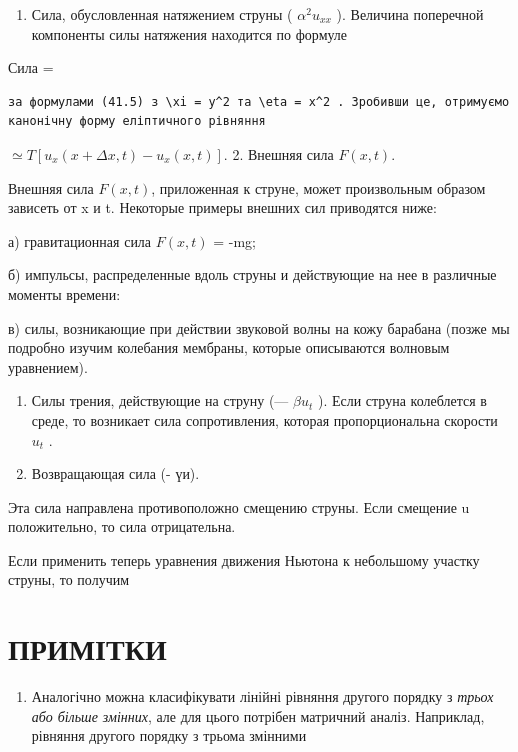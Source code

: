 \documentclass[
  ukrainian,
]{article}
\providecommand{\tightlist}{%
  \setlength{\itemsep}{0pt}\setlength{\parskip}{0pt}}
\begin{document}
\begin{enumerate}
\def\labelenumi{\arabic{enumi}.}
\tightlist
\item
  Сила, обусловленная натяжением струны ( \(\alpha^2 u_{xx}\) ).
  Величина поперечной компоненты силы натяжения находится по формуле
\end{enumerate}

Сила =

\begin{verbatim}
за формулами (41.5) з \xi = y^2 та \eta = x^2 . Зробивши це, отримуємо канонічну форму еліптичного рівняння
\end{verbatim}

\(\simeq T [u_x(x + \Delta x, t) - u_x(x, t)].\) 2. Внешняя сила
\(F (x, t)\).

Внешняя сила \(F(x, t)\), приложенная к струне, может произвольным
образом зависеть от x и t. Некоторые примеры внешних сил приводятся
ниже:

а) гравитационная сила \(F(x, t)\) = -mg;

б) импульсы, распределенные вдоль струны и действующие на нее в
различные моменты времени:

в) силы, возникающие при действии звуковой волны на кожу барабана (позже
мы подробно изучим колебания мембраны, которые описываются волновым
уравнением).

\begin{enumerate}
\def\labelenumi{\arabic{enumi}.}
\setcounter{enumi}{2}
\item
  Силы трения, действующие на струну (--- \(\beta u_t\) ). Если струна
  колеблется в среде, то возникает сила сопротивления, которая
  пропорциональна скорости \(u_t\) .
\item
  Возвращающая сила (- үи).
\end{enumerate}

Эта сила направлена противоположно смещению струны. Если смещение u
положительно, то сила отрицательна.

Если применить теперь уравнения движения Ньютона к небольшому участку
струны, то получим

\section{ПРИМІТКИ}\label{ux43fux440ux438ux43cux456ux442ux43aux438-1}

\begin{enumerate}
\def\labelenumi{\arabic{enumi}.}
\tightlist
\item
  Аналогічно можна класифікувати лінійні рівняння другого порядку з
  \emph{трьох або більше змінних}, але для цього потрібен матричний
  аналіз. Наприклад, рівняння другого порядку з трьома змінними
\end{enumerate}
\end{document}
